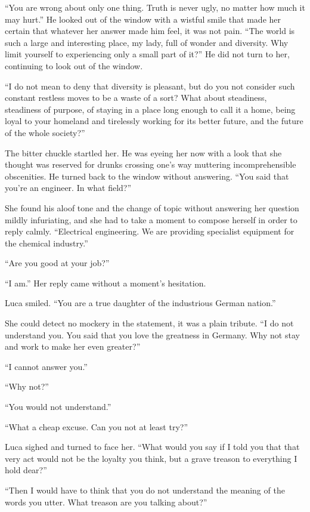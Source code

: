 ``You are wrong about only one thing. Truth is never ugly, no matter how much it may hurt.'' He looked out of the window with a wistful smile that made her certain that whatever her answer made him feel, it was not pain. ``The world is such a large and interesting place, my lady, full of wonder and diversity. Why limit yourself to experiencing only a small part of it?'' He did not turn to her, continuing to look out of the window.

``I do not mean to deny that diversity is pleasant, but do you not consider such constant restless moves to be a waste of a sort? What about steadiness, steadiness of purpose, of staying in a place long enough to call it a home, being loyal to your homeland and tirelessly working for its better future, and the future of the whole society?''

The bitter chuckle startled her. He was eyeing her now with a look that she thought was reserved for drunks crossing one's way muttering incomprehensible obscenities. He turned back to the window without answering. ``You said that you're an engineer. In what field?''

She found his aloof tone and the change of topic without answering her question mildly infuriating, and she had to take a moment to compose herself in order to reply calmly. ``Electrical engineering. We are providing specialist equipment for the chemical industry.''

``Are you good at your job?''

``I am.'' Her reply came without a moment's hesitation.

Luca smiled. ``You are a true daughter of the industrious German nation.''

She could detect no mockery in the statement, it was a plain tribute. ``I do not understand you. You said that you love the greatness in Germany. Why not stay and work to make her even greater?''

``I cannot answer you.''

``Why not?''

``You would not understand.''

``What a cheap excuse. Can you not at least try?''

Luca sighed and turned to face her. ``What would you say if I told you that that very act would not be the loyalty you think, but a grave treason to everything I hold dear?''

``Then I would have to think that you do not understand the meaning of the words you utter. What treason are you talking about?''

